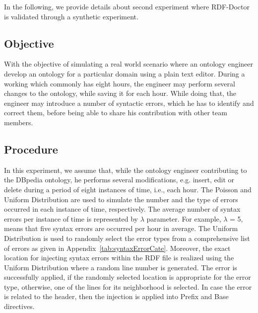 In the following, we provide details about second experiment where RDF-Doctor is validated through a synthetic experiment. 

\subsection{Objective}
With the objective of simulating a real world scenario where an ontology engineer develop an ontology for a particular domain using a plain text editor.
During a working which commonly has eight hours, the engineer may perform several changes to the ontology, while saving it for each hour.
While doing that, the engineer may introduce a number of syntactic errors, which he has to identify and correct them, before being able to share his contribution with other team members.


\subsection{Procedure}

In this experiment, we assume that, while the ontology engineer contributing to the DBpedia ontology, he performs several modifications, e.g. insert, edit or delete during a period of eight instances of time, i.e., each hour. 
The Poisson and Uniform Distribution are used to simulate the number and the type of errors occurred in each instance of time, respectively.
The average number of syntax errors per instance of time is represented by $\lambda$ parameter. 
For example, $\lambda$ = 5, means that five syntax errors are occurred per hour in average.  
The Uniform Distribution is used to randomly select the error types from a comprehensive list of errors as given in Appendix~\ref{tab:syntaxErrorCate}.
Moreover, the exact location for injecting syntax errors within the RDF file is realized using the Uniform Distribution where a random line number is generated.
The error is successfully applied, if the randomly selected location is appropriate for the error type, otherwise, one of the lines for its neighborhood is selected. 
In case the error is related to the header, then the injection is applied into Prefix and Base directives.  

